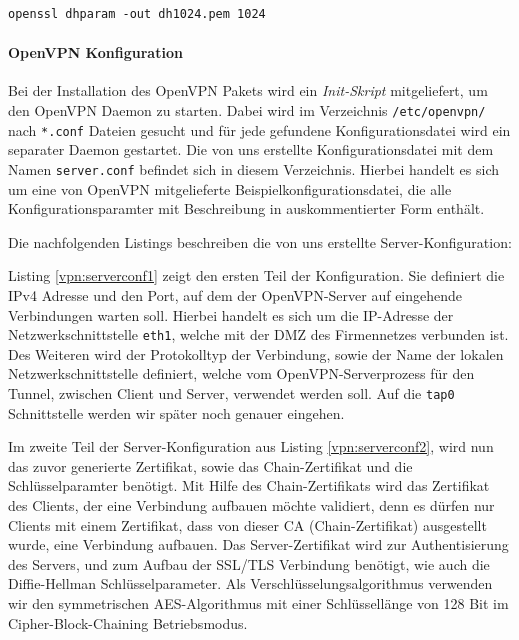 \begin{lstlisting}
openssl dhparam -out dh1024.pem 1024
\end{lstlisting}


\paragraph{OpenVPN Konfiguration} Bei der Installation des OpenVPN Pakets wird ein \emph{Init-Skript} mitgeliefert, um den OpenVPN Daemon zu starten. Dabei wird im Verzeichnis \texttt{/etc/openvpn/} nach \texttt{*.conf} Dateien gesucht und für jede gefundene Konfigurationsdatei wird ein separater Daemon gestartet. Die von uns erstellte Konfigurationsdatei mit dem Namen \texttt{server.conf} befindet sich in diesem Verzeichnis. Hierbei handelt es sich um eine von OpenVPN mitgelieferte Beispielkonfigurationsdatei, die alle Konfigurationsparamter mit Beschreibung in auskommentierter Form enthält.

Die nachfolgenden Listings beschreiben die von uns erstellte Server-Konfiguration:



Listing \ref{vpn:serverconf1} zeigt den ersten Teil der Konfiguration. Sie definiert die IPv4 Adresse und den Port, auf dem der OpenVPN-Server auf eingehende Verbindungen warten soll. Hierbei handelt es sich um die IP-Adresse der Netzwerkschnittstelle \texttt{eth1}, welche mit der DMZ des Firmennetzes verbunden ist. Des Weiteren wird der Protokolltyp der Verbindung, sowie der Name der lokalen Netzwerkschnittstelle definiert, welche vom OpenVPN-Serverprozess für den Tunnel, zwischen Client und Server, verwendet werden soll. Auf die \texttt{tap0} Schnittstelle werden wir später noch genauer eingehen.



Im zweite Teil der Server-Konfiguration aus Listing \ref{vpn:serverconf2}, wird nun das zuvor generierte Zertifikat, sowie das Chain-Zertifikat und die Schlüsselparamter benötigt. Mit Hilfe des Chain-Zertifikats wird das Zertifikat des Clients, der eine Verbindung aufbauen möchte validiert, denn es dürfen nur Clients mit einem Zertifikat, dass von dieser CA (Chain-Zertifikat) ausgestellt wurde, eine Verbindung aufbauen. Das Server-Zertifikat wird zur Authentisierung des Servers, und zum Aufbau der SSL/TLS Verbindung benötigt, wie auch die Diffie-Hellman Schlüsselparameter. Als Verschlüsselungsalgorithmus verwenden wir den symmetrischen AES-Algorithmus mit einer Schlüssellänge von 128 Bit im Cipher-Block-Chaining Betriebsmodus.

